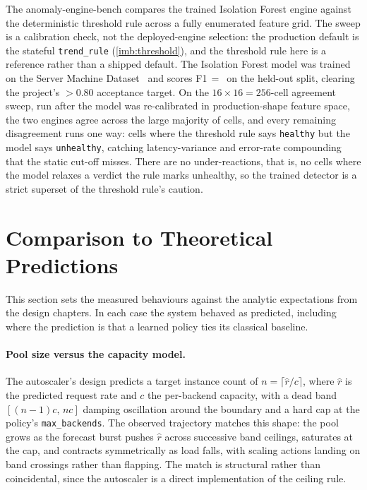 The anomaly-engine-bench compares the trained Isolation Forest engine against the
deterministic threshold rule across a fully enumerated feature grid. The sweep is a
calibration check, not the deployed-engine selection: the production default is the
stateful \texttt{trend\_rule} (\cref{imb:threshold}), and the threshold rule here is a
reference rather than a shipped default. The Isolation Forest model was
trained on the Server Machine Dataset~\cite{su2019omnianomaly} and scores
F1\,$=$\,\BMifFone{} on the held-out split, clearing the project's $>0.80$ acceptance
target. On the $16 \times 16 = 256$-cell agreement sweep, run after the model was
re-calibrated in production-shape feature space, the two engines agree across the large
majority of cells, and every remaining disagreement runs one way: cells where the
threshold rule says \texttt{healthy} but the model says \texttt{unhealthy}, catching
latency-variance and error-rate compounding that the static cut-off misses. There are
no under-reactions, that is, no cells where the model relaxes a verdict the rule marks
unhealthy, so the trained detector is a strict superset of the threshold rule's caution.

\section{Comparison to Theoretical Predictions}\label{imc:theory}

This section sets the measured behaviours against the analytic expectations from the
design chapters. In each case the system behaved as predicted, including where the
prediction is that a learned policy ties its classical baseline.

\paragraph{Pool size versus the capacity model.} The autoscaler's design predicts a
target instance count of $n = \lceil \hat{r} / c \rceil$, where $\hat{r}$ is the
predicted request rate and $c$ the per-backend capacity, with a dead band
$[(n{-}1)c,\, nc]$ damping oscillation around the boundary and a hard cap at the
policy's \texttt{max\_backends}. The observed trajectory matches this shape: the pool
grows as the forecast burst pushes $\hat{r}$ across successive band ceilings, saturates
at the cap, and contracts symmetrically as load falls, with scaling actions landing on
band crossings rather than flapping. The match is structural rather than coincidental,
since the autoscaler is a direct implementation of the ceiling rule.

